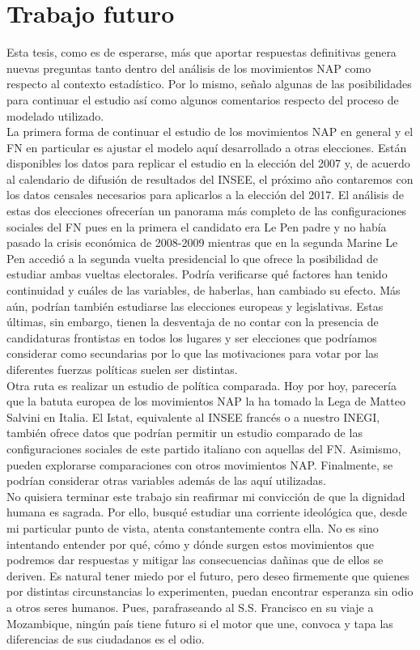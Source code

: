 \section*{Trabajo futuro}

Esta tesis, como es de esperarse, más que aportar respuestas definitivas genera nuevas preguntas tanto dentro del análisis de los movimientos NAP como respecto al contexto estadístico. Por lo mismo, señalo algunas de las posibilidades para continuar el estudio así como algunos comentarios respecto del proceso de modelado utilizado.\\

La primera forma de continuar el estudio de los movimientos NAP en general y el FN en particular es ajustar el modelo aquí desarrollado a otras elecciones. Están disponibles los datos para replicar el estudio en la elección del 2007 y, de acuerdo al calendario de difusión de resultados del INSEE, el próximo año contaremos con los datos censales necesarios para aplicarlos a la elección del 2017. El análisis de estas dos elecciones ofrecerían un panorama más completo de las configuraciones sociales del FN pues en la primera el candidato era Le Pen padre y no había pasado la crisis económica de 2008-2009 mientras que en la segunda Marine Le Pen accedió a la segunda vuelta presidencial lo que ofrece la posibilidad de estudiar ambas vueltas electorales. Podría verificarse qué factores han tenido continuidad y cuáles de las variables, de haberlas, han cambiado su efecto. Más aún, podrían también estudiarse las elecciones europeas y legislativas. Estas últimas, sin embargo, tienen la desventaja de no contar con la presencia de candidaturas frontistas en todos los lugares y ser elecciones que podríamos considerar como secundarias por lo que las motivaciones para votar por las diferentes fuerzas políticas suelen ser distintas.\\

Otra ruta es realizar un estudio de política comparada. Hoy por hoy, parecería que la batuta europea de los movimientos NAP la ha tomado la Lega de Matteo Salvini en Italia. El Istat, equivalente al INSEE francés o a nuestro INEGI, también ofrece datos que podrían permitir un estudio comparado de las configuraciones sociales de este partido italiano con aquellas del FN. Asimismo, pueden explorarse comparaciones con otros movimientos NAP. Finalmente, se podrían considerar otras variables además de las aquí utilizadas.\\

No quisiera terminar este trabajo sin reafirmar mi convicción de que la dignidad humana es sagrada. Por ello, busqué estudiar una corriente ideológica que, desde mi particular punto de vista, atenta constantemente contra ella. No es sino intentando entender por qué, cómo y dónde surgen estos movimientos que podremos dar respuestas y mitigar las consecuencias dañinas que de ellos se deriven. Es natural tener miedo por el futuro, pero deseo firmemente que quienes por distintas circunstancias lo experimenten, puedan encontrar esperanza sin odio a otros seres humanos. {\color{Red} Pues, parafraseando al S.S. Francisco en su viaje a Mozambique, ningún país tiene futuro si el motor que une, convoca y tapa las diferencias de sus ciudadanos es el odio.} 
 
 
